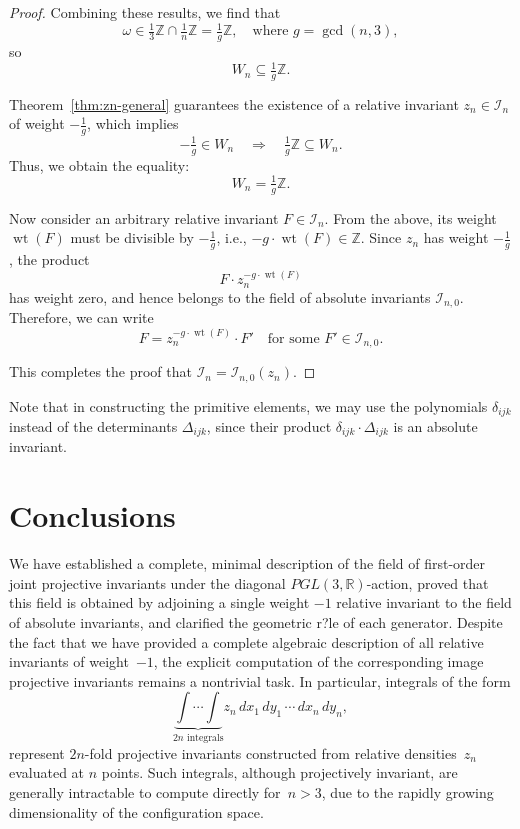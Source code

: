 \documentclass[12pt,reqno]{amsart}
\begin{document}
\begin{proof}
Combining these results, we find that
\[
\omega \in \tfrac{1}{3} \mathbb{Z} \cap \tfrac{1}{n} \mathbb{Z} = \tfrac{1}{g} \mathbb{Z}, \quad \text{where } g= \gcd(n, 3),
\]
so
\[
W_n \subseteq \tfrac{1}{g} \mathbb{Z}.
\]

Theorem~\ref{thm:zn-general} guarantees the existence of a relative invariant \( z_n \in \mathcal{I}_n \) of weight \( -\tfrac{1}{g} \), which implies
\[
-\tfrac{1}{g} \in W_n \quad \Rightarrow \quad \tfrac{1}{g} \mathbb{Z} \subseteq W_n.
\]
Thus, we obtain the equality:
\[
W_n = \tfrac{1}{g} \mathbb{Z}.
\]

Now consider an arbitrary relative invariant \( F \in \mathcal{I}_n \). From the above, its weight \( \operatorname{wt}(F) \) must be divisible by \( -\tfrac{1}{g} \), i.e., \( -g \cdot \operatorname{wt}(F) \in \mathbb{Z} \). Since \( z_n \) has weight \( -\tfrac{1}{g} \), the product
\[
F \cdot z_n^{-g \cdot \operatorname{wt}(F)}
\]
has weight zero, and hence belongs to the field of absolute invariants \( \mathcal{I}_{n,0} \). Therefore, we can write
\[
F = z_n^{-g \cdot \operatorname{wt}(F)} \cdot F'
\quad \text{for some } F' \in \mathcal{I}_{n,0}.
\]

This completes the proof that \( \mathcal{I}_n = \mathcal{I}_{n,0}(z_n) \).
\end{proof}




Note that in constructing the primitive elements, we may use the polynomials \( \delta_{ijk} \) instead of the determinants \( \Delta_{ijk} \), since their product \( \delta_{ijk} \cdot \Delta_{ijk} \) is an absolute invariant. 


\section{Conclusions}
We have established a complete, minimal description of the field of first-order joint projective invariants under the diagonal $PGL(3,\mathbb R)$-action, proved that this field is obtained by adjoining a single weight  $-1$ relative invariant to the field of absolute invariants, and clarified the geometric r?le of each generator.  
Despite the fact that we have provided a complete algebraic description of all relative invariants of weight~$-1$, the explicit computation of the corresponding image projective invariants remains a nontrivial task. In particular, integrals of the form
\[
\underbrace{\int\!\cdots\!\int}_{2n \text{  integrals} } z_n\,dx_1\,dy_1\,\cdots\,dx_n\,dy_n,
\]
represent $2n$-fold projective invariants constructed from relative densities~$z_n$ evaluated at $n$ points. Such integrals, although projectively invariant, are generally intractable to compute directly for~$n > 3$, due to the rapidly growing dimensionality of the configuration space.
\end{document}
